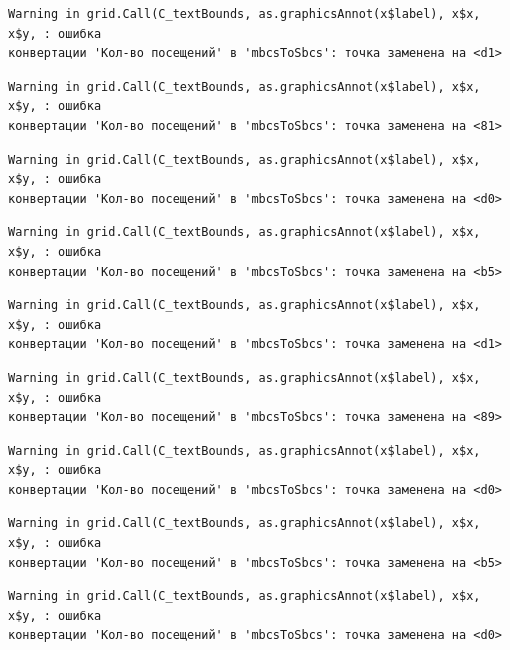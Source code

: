 \documentclass[
  letterpaper,
  DIV=11,
  numbers=noendperiod]{scrreprt}
\begin{document}
\begin{verbatim}
Warning in grid.Call(C_textBounds, as.graphicsAnnot(x$label), x$x, x$y, : ошибка
конвертации 'Кол-во посещений' в 'mbcsToSbcs': точка заменена на <d1>
\end{verbatim}

\begin{verbatim}
Warning in grid.Call(C_textBounds, as.graphicsAnnot(x$label), x$x, x$y, : ошибка
конвертации 'Кол-во посещений' в 'mbcsToSbcs': точка заменена на <81>
\end{verbatim}

\begin{verbatim}
Warning in grid.Call(C_textBounds, as.graphicsAnnot(x$label), x$x, x$y, : ошибка
конвертации 'Кол-во посещений' в 'mbcsToSbcs': точка заменена на <d0>
\end{verbatim}

\begin{verbatim}
Warning in grid.Call(C_textBounds, as.graphicsAnnot(x$label), x$x, x$y, : ошибка
конвертации 'Кол-во посещений' в 'mbcsToSbcs': точка заменена на <b5>
\end{verbatim}

\begin{verbatim}
Warning in grid.Call(C_textBounds, as.graphicsAnnot(x$label), x$x, x$y, : ошибка
конвертации 'Кол-во посещений' в 'mbcsToSbcs': точка заменена на <d1>
\end{verbatim}

\begin{verbatim}
Warning in grid.Call(C_textBounds, as.graphicsAnnot(x$label), x$x, x$y, : ошибка
конвертации 'Кол-во посещений' в 'mbcsToSbcs': точка заменена на <89>
\end{verbatim}

\begin{verbatim}
Warning in grid.Call(C_textBounds, as.graphicsAnnot(x$label), x$x, x$y, : ошибка
конвертации 'Кол-во посещений' в 'mbcsToSbcs': точка заменена на <d0>
\end{verbatim}

\begin{verbatim}
Warning in grid.Call(C_textBounds, as.graphicsAnnot(x$label), x$x, x$y, : ошибка
конвертации 'Кол-во посещений' в 'mbcsToSbcs': точка заменена на <b5>
\end{verbatim}

\begin{verbatim}
Warning in grid.Call(C_textBounds, as.graphicsAnnot(x$label), x$x, x$y, : ошибка
конвертации 'Кол-во посещений' в 'mbcsToSbcs': точка заменена на <d0>
\end{verbatim}
\end{document}
